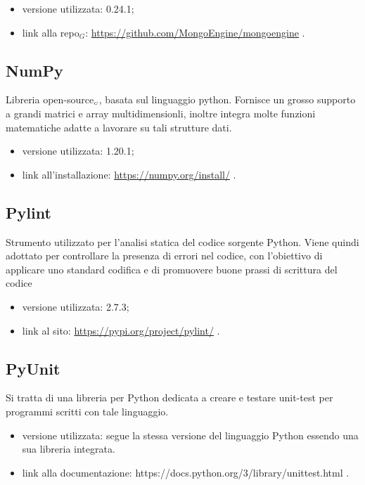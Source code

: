 \begin{itemize}
  \item versione utilizzata: 0.24.1;
  \item link alla repo$_G$: \url{https://github.com/MongoEngine/mongoengine} .
\end{itemize}

\subsection{NumPy}\label{LibrerieNumpy}
Libreria open-source$_{\scaleto{G}{3pt}}$, basata sul linguaggio python.
Fornisce un grosso supporto a grandi matrici e array multidimensionli, inoltre integra molte funzioni matematiche adatte a lavorare su tali strutture dati.

\begin{itemize}
  \item versione utilizzata: 1.20.1;
  \item link all'installazione: \url{https://numpy.org/install/} .
\end{itemize}

\subsection{Pylint}\label{LibreriePylint}
Strumento utilizzato per l’analisi statica del codice sorgente Python. Viene quindi adottato per controllare la presenza di errori nel codice, con l’obiettivo di applicare uno standard codifica e di promuovere buone prassi di scrittura del codice

\begin{itemize}
  \item versione utilizzata: 2.7.3;
  \item link al sito: \url{https://pypi.org/project/pylint/} .
\end{itemize}

\subsection{PyUnit}\label{LibreriePyUnit}
Si tratta di una libreria per Python dedicata a creare e testare unit-test per programmi scritti con tale linguaggio.

\begin{itemize}
  \item versione utilizzata: segue la stessa versione del linguaggio Python essendo una sua libreria integrata.
  \item link  alla documentazione: https://docs.python.org/3/library/unittest.html .
\end{itemize}


